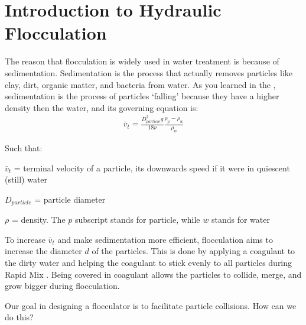 \documentclass[letterpaper,10pt,english]{sphinxmanual}
\begin{document}
\section{Introduction to Hydraulic Flocculation}
\label{\detokenize{Flocculation/Floc_Design:introduction-to-hydraulic-flocculation}}
The reason that flocculation is widely used in water treatment is because of sedimentation. Sedimentation is the process that actually removes particles like clay, dirt, organic matter, and bacteria from water. As you learned in the
{\hyperref[\detokenize{Introduction/Introduction:heading-treatment-trains}]{}}, sedimentation is the process of particles ‘falling’ because they have a higher density then the water, and its governing equation is:
\begin{equation}\label{equation:Flocculation/Floc_Design:Flocculation/Floc_Design:0}
\begin{split}\bar v_t = \frac{D_{particle}^2 g}{18 \nu} \frac{\rho_p - \rho_w}{\rho_w}\end{split}
\end{equation}
\begin{DUlineblock}{0em}
\item[] Such that:
\item[] \(\bar v_t\) = terminal velocity of a particle, its downwards speed if it were in quiescent (still) water
\item[] \(D_{particle}\) = particle diameter
\item[] \(\rho\) = density. The \(p\) subscript stands for particle, while \(w\) stands for water
\end{DUlineblock}

To increase \(\bar v_t\) and make sedimentation more efficient, flocculation aims to increase the diameter \(d\) of the particles. This is done by applying a coagulant to the dirty water and helping the coagulant to stick evenly to all particles during Rapid Mix . Being covered in coagulant allows the particles to collide, merge, and grow bigger during flocculation.

Our goal in designing a flocculator is to facilitate particle collisions. How can we do this?
\end{document}

